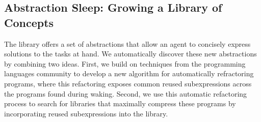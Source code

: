 \documentclass{article}
\newcommand{\probability}{\mathds{P}} %
\begin{document}





\subsection{Abstraction Sleep: Growing a Library of Concepts}\label{consolidationSection}

The library offers a set of abstractions that allow an agent to concisely
express solutions to the tasks at hand. We automatically discover
these new abstractions by combining two ideas. First, we build on
techniques from the programming languages community to develop a new
algorithm for automatically refractoring programs, where this
refactoring exposes common reused subexpressions across the
programs found during waking.  Second, we use this automatic refactoring
process to search for libraries that maximally compress these programs by
incorporating reused subexpressions into the library.
\end{document}
